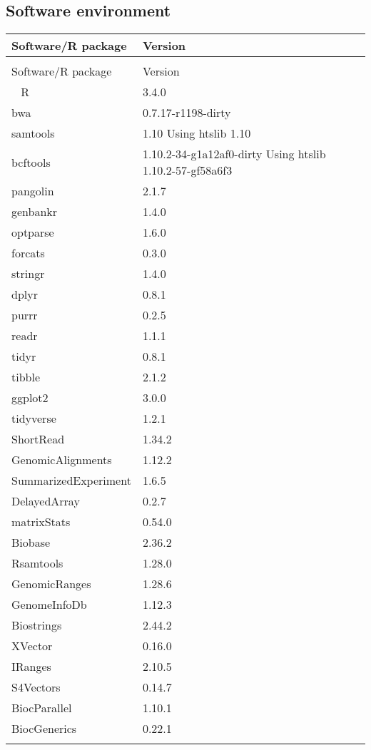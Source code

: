 \documentclass[12pt,]{article}
\begin{document}
\newpage

\newpage

\subsection{Software environment}\label{software-environment}

\begin{longtable}{>{\raggedright\arraybackslash}p{5cm}l}
\toprule
Software/R package & Version\\
\midrule
\endfirsthead
\multicolumn{2}{@{}l}{\textit{(continued)}}\\
\toprule
Software/R package & Version\\
\midrule
\endhead
\
\endfoot
\bottomrule
\endlastfoot
R & 3.4.0\\
bwa & 0.7.17-r1198-dirty\\
samtools & 1.10 Using htslib 1.10\\
bcftools & 1.10.2-34-g1a12af0-dirty Using htslib 1.10.2-57-gf58a6f3\\
pangolin & 2.1.7\\
genbankr & 1.4.0\\
optparse & 1.6.0\\
forcats & 0.3.0\\
stringr & 1.4.0\\
dplyr & 0.8.1\\
purrr & 0.2.5\\
readr & 1.1.1\\
tidyr & 0.8.1\\
tibble & 2.1.2\\
ggplot2 & 3.0.0\\
tidyverse & 1.2.1\\
ShortRead & 1.34.2\\
GenomicAlignments & 1.12.2\\
SummarizedExperiment & 1.6.5\\
DelayedArray & 0.2.7\\
matrixStats & 0.54.0\\
Biobase & 2.36.2\\
Rsamtools & 1.28.0\\
GenomicRanges & 1.28.6\\
GenomeInfoDb & 1.12.3\\
Biostrings & 2.44.2\\
XVector & 0.16.0\\
IRanges & 2.10.5\\
S4Vectors & 0.14.7\\
BiocParallel & 1.10.1\\
BiocGenerics & 0.22.1\\*
\end{longtable}
\end{document}
